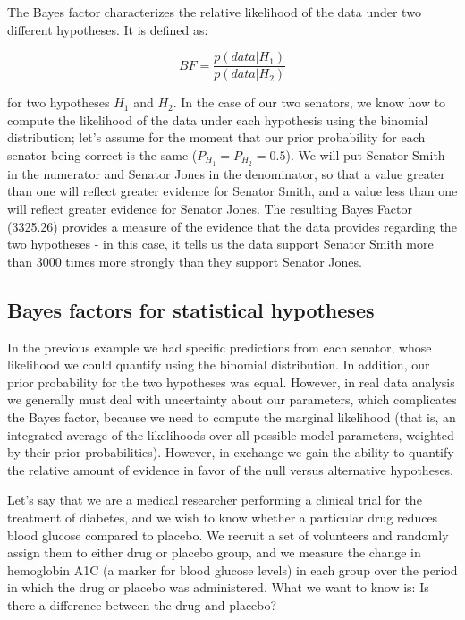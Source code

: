 \documentclass[12pt,]{book}
\theoremstyle{definition}
\theoremstyle{definition}
\theoremstyle{definition}
\theoremstyle{remark}
\begin{document}
The Bayes factor characterizes the relative likelihood of the data under two different hypotheses. It is defined as:

\[
BF = \frac{p(data|H_1)}{p(data|H_2)}
\]

for two hypotheses \(H_1\) and \(H_2\). In the case of our two senators, we know how to compute the likelihood of the data under each hypothesis using the binomial distribution; let's assume for the moment that our prior probability for each senator being correct is the same (\(P_{H_1} = P_{H_2} = 0.5\)). We will put Senator Smith in the numerator and Senator Jones in the denominator, so that a value greater than one will reflect greater evidence for Senator Smith, and a value less than one will reflect greater evidence for Senator Jones. The resulting Bayes Factor (3325.26) provides a measure of the evidence that the data provides regarding the two hypotheses - in this case, it tells us the data support Senator Smith more than 3000 times more strongly than they support Senator Jones.

\hypertarget{bayes-factors-for-statistical-hypotheses}{%
\subsection{Bayes factors for statistical hypotheses}\label{bayes-factors-for-statistical-hypotheses}}

In the previous example we had specific predictions from each senator, whose likelihood we could quantify using the binomial distribution. In addition, our prior probability for the two hypotheses was equal. However, in real data analysis we generally must deal with uncertainty about our parameters, which complicates the Bayes factor, because we need to compute the marginal likelihood (that is, an integrated average of the likelihoods over all possible model parameters, weighted by their prior probabilities). However, in exchange we gain the ability to quantify the relative amount of evidence in favor of the null versus alternative hypotheses.

Let's say that we are a medical researcher performing a clinical trial for the treatment of diabetes, and we wish to know whether a particular drug reduces blood glucose compared to placebo. We recruit a set of volunteers and randomly assign them to either drug or placebo group, and we measure the change in hemoglobin A1C (a marker for blood glucose levels) in each group over the period in which the drug or placebo was administered. What we want to know is: Is there a difference between the drug and placebo?
\end{document}
